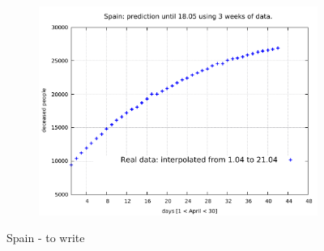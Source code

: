 \documentclass[8pt]{article}
\begin{document}
\begin{figure}[h!]
\begin{subfigure}[b]{0.45\linewidth}
  \includegraphics[width=\linewidth]{../tuned/sp/1-21/1-21.pdf}
  \end{subfigure}
	\caption{Spain - to write}
\end{figure}
\end{document}
